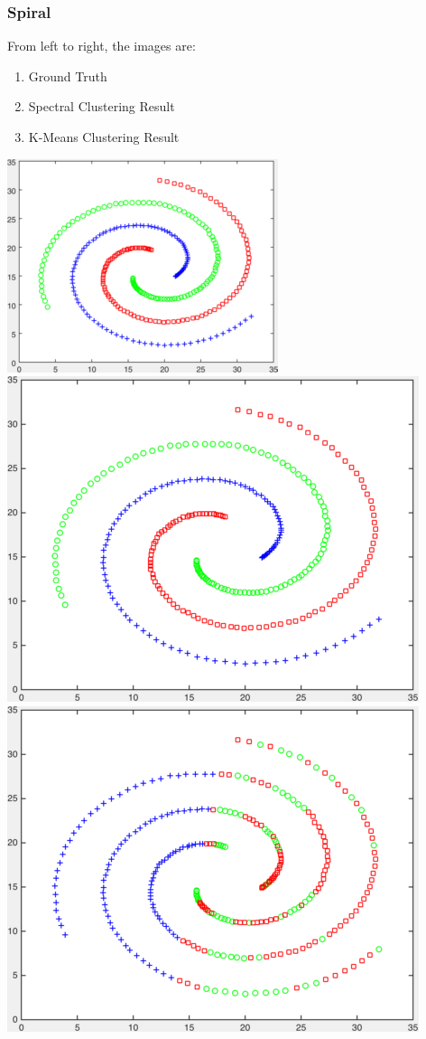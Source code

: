\documentclass[11pt]{article}
\begin{document}
\subsubsection*{Spiral} 
From left to right, the images are:
\begin{enumerate}
\item Ground Truth
\item Spectral Clustering Result
\item K-Means Clustering Result
\end{enumerate}
\begin{center}
\includegraphics[scale=0.5]{spiral} \ 
\includegraphics[scale=0.25]{results_spectral_spiral} \ 
\includegraphics[scale=0.25]{results_kmeans_spiral}
\end{center}
\end{document}
